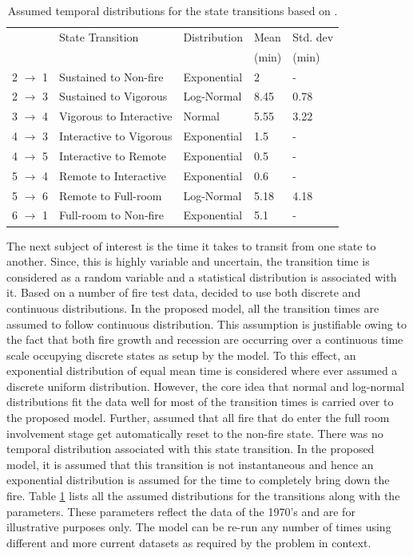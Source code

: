 \documentclass[12pt]{asme2ej}
\begin{document}
\begin{table}[!h]\centering
\caption{Assumed temporal distributions for the state transitions based on \cite{Berlin1985}. \label{tbl:FireAssumedDists}}
\begin{tabular}{l l l l l}
\hline
	&	State Transition	&	Distribution	&	Mean	&	Std. dev	\\
	&										&								& (min)	& (min) \\
	\hline
2 $\rightarrow$ 1	&	Sustained to Non-fire	&	Exponential	&	2	&	-	\\
2 $\rightarrow$ 3	&	Sustained to Vigorous	&	Log-Normal	&	8.45	&	0.78	\\
3 $\rightarrow$ 4	&	Vigorous to Interactive 	&	Normal	&	5.55	&	3.22	\\
4 $\rightarrow$ 3	&	Interactive to Vigorous 	&	Exponential	&	1.5	&	-	\\
4 $\rightarrow$ 5	&	Interactive to Remote	&	Exponential	&	0.5	&	-	\\
5 $\rightarrow$ 4	&	Remote to Interactive	&	Exponential	&	0.6	&	-	\\
5 $\rightarrow$ 6	&	Remote to Full-room	&	Log-Normal	&	5.18	&	4.18	\\
6 $\rightarrow$ 1	&	Full-room to Non-fire	&	Exponential	&	5.1	&	-	\\
\hline
\end{tabular}
\end{table}

The next subject of interest is the time it takes to transit from one state to another. Since, this is highly variable and uncertain, the transition time is considered as a random variable and a statistical distribution is associated with it. 
Based on a number of fire test data, \cite{Berlin1985} decided to use both discrete and continuous distributions. In the proposed model, all the transition times are assumed to follow continuous distribution. This assumption is justifiable owing to the fact that both fire growth and recession are occurring over a continuous time scale occupying discrete states as setup by the model. To this effect, an exponential distribution of equal mean time is considered where ever \cite{Berlin1985} assumed a discrete uniform distribution. However, the core idea that normal and log-normal distributions fit the data well for most of the transition times is carried over to the proposed model. Further, \cite{Berlin1985} assumed that all fire that do enter the full room involvement stage get automatically reset to the non-fire state. There was no temporal distribution associated with this state transition. In the proposed model, it is assumed that this transition is not instantaneous and hence an exponential distribution is assumed for the time to completely bring down the fire. Table \ref{tbl:FireAssumedDists} lists all the assumed distributions for the transitions along with the parameters. These parameters reflect the data of the 1970's and are for illustrative purposes only. The model can be re-run any number of times using different and more current datasets as required by the problem in context.

\end{document}
